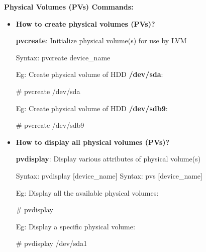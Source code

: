 \setlength{\columnsep}{3pt}
\begin{flushleft}
	
		\bigskip
	
		\textbf{Physical Volumes (PVs) Commands:}
		
		\begin{itemize}
			\item 		\textbf{How to create physical volumes (PVs)?}
			
			\textbf{pvcreate}: Initialize physical volume(s) for use by LVM
			\begin{tcolorbox}[breakable,notitle,boxrule=-0pt,colback=pink,colframe=pink]
				\color{black}
				\font=9pt
				Syntax: pvcreate device\_name
				\font=4pt
			\end{tcolorbox}
			
			
			Eg: Create physical volume of HDD \textbf{/dev/sda}:
			\begin{tcolorbox}[breakable,notitle,boxrule=-0pt,colback=black,colframe=black]
				\color{green}
				\font=9pt
				\# pvcreate /dev/sda
				\font=4pt
			\end{tcolorbox}
			
			Eg: Create physical volume of HDD \textbf{/dev/sdb9}:
			\begin{tcolorbox}[breakable,notitle,boxrule=-0pt,colback=black,colframe=black]
				\color{green}
				\font=9pt
				\# pvcreate /dev/sdb9
				\font=4pt
			\end{tcolorbox}
			
		\end{itemize}
	
	
	\bigskip
	\bigskip
	\begin{itemize}
		\item 	\textbf{How to display all physical volumes (PVs)?}
		
		\textbf{pvdisplay}: Display various attributes of physical volume(s)
		\begin{tcolorbox}[breakable,notitle,boxrule=-0pt,colback=pink,colframe=pink]
			\color{black}
			\font=9pt
			Syntax: pvdisplay [device\_name]
			\newline
			Syntax: pvs [device\_name]
			\font=4pt
		\end{tcolorbox}
		
		Eg: Display all the available physical volumes:
		\begin{tcolorbox}[breakable,notitle,boxrule=-0pt,colback=black,colframe=black]
			\color{green}
			\font=9pt
			\# pvdisplay
			\font=4pt
		\end{tcolorbox}
		Eg: Display a specific physical volume:
		\begin{tcolorbox}[breakable,notitle,boxrule=-0pt,colback=black,colframe=black]
			\color{green}
			\font=9pt
			\# pvdisplay /dev/sda1
			\font=4pt
		\end{tcolorbox}
	

\end{itemize}
\end{flushleft}
